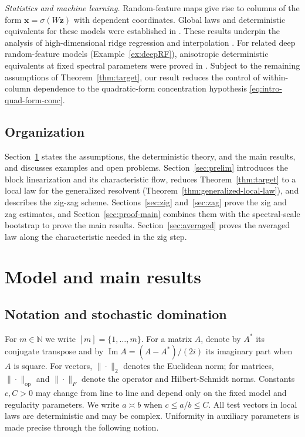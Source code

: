 \documentclass[11pt,reqno]{amsart}
\def\x{\mathbf{x}}
\def\z{\mathbf{z}}
\def\N{\mathbb{N}}
\def\Im{\operatorname{Im}}
\def\op{\mathrm{op}}
\theoremstyle{definition}
\numberwithin{equation}{section}
\numberwithin{figure}{section}
\begin{document}
\emph{Statistics and machine learning.}
Random-feature maps give rise to columns of the form $\x=\sigma(W\z)$ with dependent coordinates. Global laws and deterministic equivalents for these models were established in \cite{pennington2017nonlinear,louart2018random,benigni2021eigenvalue,fan2020spectra,mei2022generalization,wang2024nonlinear}. These results underpin the analysis of high-dimensional ridge regression and interpolation \cite{wu2020optimal,hastie2022surprises,mei2022generalization,couillet2022random,defilippis2024dimension}. For related deep random-feature models (Example~\ref{ex:deepRF}), anisotropic deterministic equivalents at fixed spectral parameters were proved in \cite{schroder2023deterministic}. Subject to the remaining assumptions of Theorem~\ref{thm:target}, our result reduces the control of within-column dependence to the quadratic-form concentration hypothesis \eqref{eq:intro-quad-form-conc}.


\subsection{Organization}


Section~\ref{sec:main} states the assumptions, the deterministic theory, and the main results, and discusses examples and open problems. Section~\ref{sec:prelim} introduces the block linearization and its characteristic flow, reduces Theorem~\ref{thm:target} to a local law for the generalized resolvent (Theorem~\ref{thm:generalized-local-law}), and describes the zig-zag scheme. Sections~\ref{sec:zig} and~\ref{sec:zag} prove the zig and zag estimates, and Section~\ref{sec:proof-main} combines them with the spectral-scale bootstrap to prove the main results. Section~\ref{sec:averaged} proves the averaged law along the characteristic needed in the zig step.

\section{Model and main results}\label{sec:main}


\subsection{Notation and stochastic domination}

For $m\in\N$ we write $[m]=\{1,\ldots,m\}$. For a matrix $A$, denote by $A^*$ its conjugate transpose and by $\Im A=(A-A^*)/(2i)$ its imaginary part when $A$ is square. For vectors, $\|\cdot\|_2$ denotes the Euclidean norm; for matrices, $\|\cdot\|_\op$ and $\|\cdot\|_F$ denote the operator and Hilbert-Schmidt norms. Constants $c,C>0$ may change from line to line and depend only on the fixed model and regularity parameters. We write $a\asymp b$ when $c\le a/b\le C$. All test vectors in local laws are deterministic and may be complex. Uniformity in auxiliary parameters is made precise through the following notion.
\end{document}
